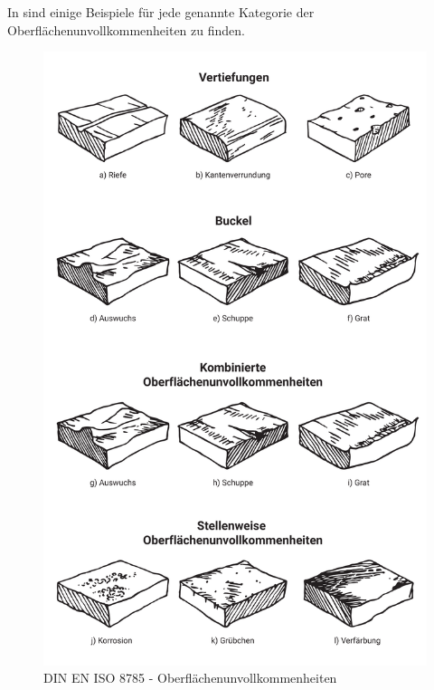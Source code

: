 In  sind einige Beispiele für jede genannte Kategorie der Oberflächenunvollkommenheiten zu finden. 

\begin{figure}[h]
	\centering
	\includegraphics[width=0.7\linewidth]{img/din_en_8785_beispiele}
	\caption[DIN EN ISO 8785 - Oberflächenunvollkommenheiten]{DIN EN ISO 8785 - Oberflächenunvollkommenheiten}
	\label{fig:din-en-8785-beispiele}
\end{figure}









 






          


